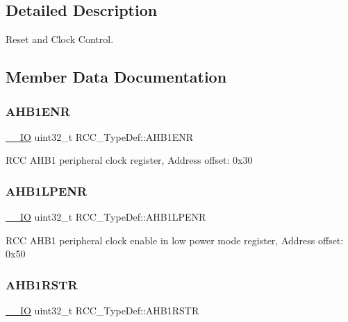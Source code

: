 \subsection{Detailed Description}
Reset and Clock Control. 

\subsection{Member Data Documentation}
\mbox{\label{struct_r_c_c___type_def_af58a7ad868f07f8759eac3e31b6fa79e}} 
\subsubsection{\texorpdfstring{AHB1ENR}{AHB1ENR}}
{\footnotesize\ttfamily \mbox{\hyperlink{core__sc300_8h_aec43007d9998a0a0e01faede4133d6be}{\+\_\+\+\_\+\+IO}} uint32\+\_\+t R\+C\+C\+\_\+\+Type\+Def\+::\+A\+H\+B1\+E\+NR}

R\+CC A\+H\+B1 peripheral clock register, Address offset\+: 0x30 \mbox{\label{struct_r_c_c___type_def_a89d6c21f02196b7f59bcc30c1061dd87}} 
\subsubsection{\texorpdfstring{AHB1LPENR}{AHB1LPENR}}
{\footnotesize\ttfamily \mbox{\hyperlink{core__sc300_8h_aec43007d9998a0a0e01faede4133d6be}{\+\_\+\+\_\+\+IO}} uint32\+\_\+t R\+C\+C\+\_\+\+Type\+Def\+::\+A\+H\+B1\+L\+P\+E\+NR}

R\+CC A\+H\+B1 peripheral clock enable in low power mode register, Address offset\+: 0x50 \mbox{\label{struct_r_c_c___type_def_ad6abf71a348744aa3f2b7e8b214c1ca4}} 
\subsubsection{\texorpdfstring{AHB1RSTR}{AHB1RSTR}}
{\footnotesize\ttfamily \mbox{\hyperlink{core__sc300_8h_aec43007d9998a0a0e01faede4133d6be}{\+\_\+\+\_\+\+IO}} uint32\+\_\+t R\+C\+C\+\_\+\+Type\+Def\+::\+A\+H\+B1\+R\+S\+TR}

